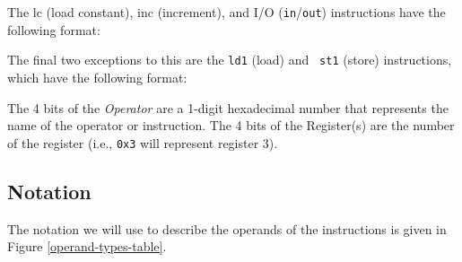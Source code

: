 The lc (load constant), inc (increment), and I/O
({\tt in}/{\tt out}) instructions have the following format:



The final two exceptions to this are the {\tt ld1} (load) and {\tt
st1} (store) instructions, which have the following format:


The 4 bits of the {\em Operator} are a 1-digit hexadecimal number that
represents the name of the operator or instruction.  The 4 bits of the
Register(s) are the number of the register (i.e., {\tt 0x3} will
represent register 3).
 
\subsection{Notation}

The notation we will use to describe the operands of the
instructions is given in Figure \ref{operand-types-table}.

